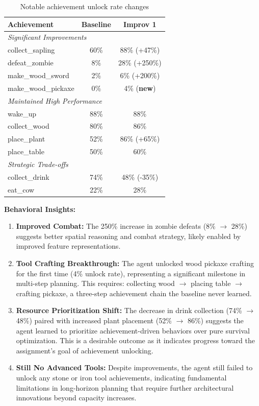 \documentclass[twocolumn]{article}
\begin{document}
\begin{table}[H]
\centering
\small
\begin{tabular}{lcc}
\toprule
\textbf{Achievement} & \textbf{Baseline} & \textbf{Improv 1} \\
\midrule
\multicolumn{3}{l}{\textit{Significant Improvements}} \\
collect\_sapling & 60\% & 88\% (+47\%) \\
defeat\_zombie & 8\% & 28\% (+250\%) \\
make\_wood\_sword & 2\% & 6\% (+200\%) \\
make\_wood\_pickaxe & 0\% & 4\% (\textbf{new}) \\
\midrule
\multicolumn{3}{l}{\textit{Maintained High Performance}} \\
wake\_up & 88\% & 88\% \\
collect\_wood & 80\% & 86\% \\
place\_plant & 52\% & 86\% (+65\%) \\
place\_table & 50\% & 60\% \\
\midrule
\multicolumn{3}{l}{\textit{Strategic Trade-offs}} \\
collect\_drink & 74\% & 48\% (-35\%) \\
eat\_cow & 22\% & 28\% \\
\bottomrule
\end{tabular}
\caption{Notable achievement unlock rate changes}
\end{table}

\textbf{Behavioral Insights:}

\begin{enumerate}
    \item \textbf{Improved Combat:} The 250\% increase in zombie defeats (8\% $\rightarrow$ 28\%) suggests better spatial reasoning and combat strategy, likely enabled by improved feature representations.
    
    \item \textbf{Tool Crafting Breakthrough:} The agent unlocked wood pickaxe crafting for the first time (4\% unlock rate), representing a significant milestone in multi-step planning. This requires: collecting wood $\rightarrow$ placing table $\rightarrow$ crafting pickaxe, a three-step achievement chain the baseline never learned.
    
    \item \textbf{Resource Prioritization Shift:} The decrease in drink collection (74\% $\rightarrow$ 48\%) paired with increased plant placement (52\% $\rightarrow$ 86\%) suggests the agent learned to prioritize achievement-driven behaviors over pure survival optimization. This is a desirable outcome as it indicates progress toward the assignment's goal of achievement unlocking.
    
    \item \textbf{Still No Advanced Tools:} Despite improvements, the agent still failed to unlock any stone or iron tool achievements, indicating fundamental limitations in long-horizon planning that require further architectural innovations beyond capacity increases.
\end{enumerate}
\end{document}
